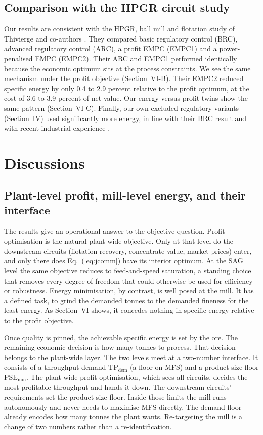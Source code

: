 \documentclass[conference]{IEEEtran}
\begin{document}
\subsection{Comparison with the HPGR circuit study}

Our results are consistent with the HPGR, ball mill and flotation study
of Thivierge and co-authors \cite{thivierge2023}. They compared basic
regulatory control (BRC), advanced regulatory control (ARC), a profit
EMPC (EMPC1) and a power-penalised EMPC (EMPC2). Their ARC and EMPC1
performed identically because the economic optimum sits at the process
constraints. We see the same mechanism under the profit objective
(Section~VI-B). Their EMPC2 reduced specific energy by only 0.4
to 2.9 percent relative to the profit optimum, at the cost of 3.6 to
3.9 percent of net value. Our energy-versus-profit twins show the same
pattern (Section~VI-C). Finally, our own excluded regulatory variants
(Section~IV) used significantly more energy, in line with their BRC
result and with recent industrial experience \cite{costa2025}.

\section{Discussions}

\subsection{Plant-level profit, mill-level energy, and their interface}

The results give an operational answer to the objective question. Profit
optimisation is the natural plant-wide objective. Only at that level do
the downstream circuits (flotation recovery, concentrate value, market
prices) enter, and only there does Eq.~(\ref{eq:jcomm}) have its interior
optimum. At the SAG level the same objective reduces to feed-and-speed
saturation, a standing choice that removes every degree of freedom that
could otherwise be used for efficiency or robustness. Energy
minimisation, by contrast, is well posed at the mill. It has a defined
task, to grind the demanded tonnes to the demanded fineness for the least
energy. As Section~VI shows, it concedes nothing in specific energy
relative to the profit objective.

Once quality is pinned, the achievable specific energy is set by the
ore. The remaining economic decision is how many tonnes to process.
That decision belongs to the plant-wide layer. The two levels meet at a
two-number interface. It consists of a
throughput demand $\mathrm{TP}_{\mathrm{dem}}$ (a floor on MFS) and a
product-size floor $\mathrm{PSE}_{\min}$. The plant-wide profit
optimisation, which sees all circuits, decides the most profitable
throughput and hands it down. The downstream circuits' requirements set
the product-size floor. Inside those limits the mill runs autonomously
and never needs to maximise MFS directly. The demand floor already
encodes how many tonnes the plant wants. Re-targeting the mill is a
change of two numbers rather than a re-identification.
\end{document}
